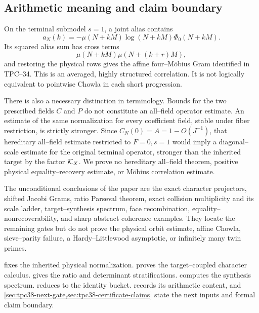 \subsection{Arithmetic meaning and claim boundary}

On the terminal submodel \(s=1\), a joint alias contains
\begin{equation}
 a_N(k)=-\mu(N+kM)\log(N+kM)\Phi_0(N+kM).
 \label{eq:tpc38-intro-terminal-sequence}
\end{equation}
Its squared alias sum has cross terms
\begin{equation}
 \mu(N+kM)\mu(N+(k+r)M),
 \label{eq:tpc38-intro-Mobius-correlation}
\end{equation}
and restoring the physical rows gives the affine four--M\"obius Gram
identified in TPC--34.  This is an averaged, highly structured
correlation.  It is not logically equivalent to pointwise Chowla in each
short progression.

There is also a necessary distinction in terminology.  Bounds for the two
prescribed fields \(C\) and \(P\) do not constitute an all--field operator
estimate.  An estimate of the same normalization for every coefficient
field, stable under fiber restriction, is strictly stronger.  Since
\(C_N(0)=A=1-O(J^{-1})\), that hereditary all--field estimate
restricted to \(F=0,s=1\) would imply a diagonal--scale estimate for the
original terminal operator, stronger than the inherited target by the
factor \(\mathcal K_X\).  We prove no hereditary all--field theorem, positive
physical equality--recovery estimate, or M\"obius correlation estimate.

The unconditional conclusions of the paper are the exact character
projectors, shifted Jacobi Grams, ratio Parseval theorem, exact collision
multiplicity and its scale ladder,
target--synthesis spectrum, face recombination, equality--nonrecoverability,
and sharp abstract coherence examples.  They locate the remaining gates
but do not prove the physical orbit estimate, affine Chowla, sieve--parity failure, a
Hardy--Littlewood asymptotic, or infinitely many twin primes.

 fixes the inherited physical normalization.
 proves the target--coupled character
calculus.   gives the ratio and determinant
stratifications.   computes the synthesis
spectrum.   reduces to the identity bucket.
 records its arithmetic content, and
\cref{sec:tpc38-next-gate,sec:tpc38-certificate-claims} state the next
inputs and formal claim boundary.
